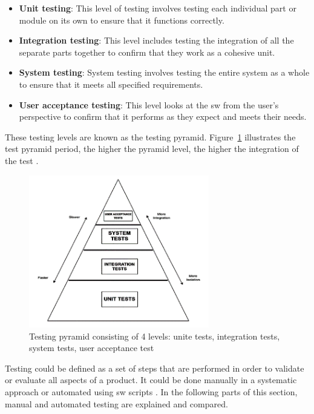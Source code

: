 \begin{itemize}
    \item \textbf{Unit testing}: This level of testing involves testing each individual part or module on its own to ensure that it functions correctly.
    \item \textbf{Integration testing}: This level includes testing the integration of all the separate parts together to confirm that they work as a cohesive unit.
    \item \textbf{System testing}: System testing involves testing the entire system as a whole to ensure that it meets all specified requirements.
    \item \textbf{User acceptance testing}: This level looks at the \gls{sw} from the user's perspective to confirm that it performs as they expect and meets their needs.
\end{itemize}

These testing levels are known as the testing pyramid. Figure~\ref{TP} illustrates the test pyramid period, the higher the pyramid level, the higher the integration of the test \cite{leloudas2023}.

\begin{figure}[ht]
    \centering
    \includegraphics[width=0.7\textwidth]{Figures/Testing_triangle.png}  %
    \caption{Testing pyramid consisting of 4 levels: unite tests, integration tests, system tests, user acceptance test \cite{leloudas2023}}
    \label{TP}
\end{figure}

Testing could be defined as a set of steps that are performed in order to validate or evaluate all aspects of a product. It could be done manually in a systematic approach or automated using \gls{sw} scripts \cite{shiwangi2014}. In the following parts of this section, manual and automated testing are explained and compared.


